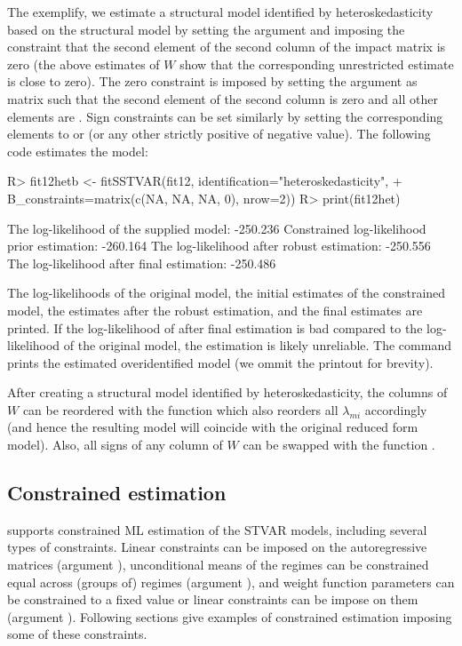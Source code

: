 \documentclass[nojss]{jss}
\begin{document}
The exemplify, we estimate a structural model identified by heteroskedasticity based on the structural model  by setting the argument  and imposing the constraint that the second element of the second column of the impact matrix is zero (the above estimates of $W$ show that the corresponding unrestricted estimate is close to zero). The zero constraint is imposed by setting the argument  as matrix such that the second element of the second column is zero and all other elements are . Sign constraints can be set similarly by setting the corresponding elements to  or  (or any other strictly positive of negative value). The following code estimates the model:
\begin{CodeChunk}
\begin{CodeInput}
R> fit12hetb <- fitSSTVAR(fit12, identification="heteroskedasticity",
+    B_constraints=matrix(c(NA, NA, NA, 0), nrow=2))
R> print(fit12het)
\end{CodeInput}
\begin{CodeOutput}
The log-likelihood of the supplied model:    -250.236
Constrained log-likelihood prior estimation: -260.164
The log-likelihood after robust estimation:  -250.556
The log-likelihood after final estimation:   -250.486
\end{CodeOutput}
\end{CodeChunk}
The log-likelihoods of the original model, the initial estimates of the constrained model, the estimates after the robust estimation, and the final estimates are printed. If the log-likelihood of after final estimation is bad compared to the log-likelihood of the original model, the estimation is likely unreliable. The command  prints the estimated overidentified model (we ommit the printout for brevity).

After creating a structural model identified by heteroskedasticity, the columns of $W$ can be reordered with the function  which also reorders all $\lambda_{mi}$ accordingly (and hence the resulting model will coincide with the original reduced form model). Also, all signs of any column of $W$ can be swapped with the function .

\subsection{Constrained estimation}\label{sec:examp_const}
 supports constrained ML estimation of the STVAR models, including several types of constraints. Linear constraints can be imposed on the autoregressive matrices (argument ), unconditional means of the regimes can be constrained equal across (groups of) regimes (argument ), and weight function parameters can be constrained to a fixed value or linear constraints can be impose on them (argument ). Following sections give examples of constrained estimation imposing some of these constraints.
\end{document}
